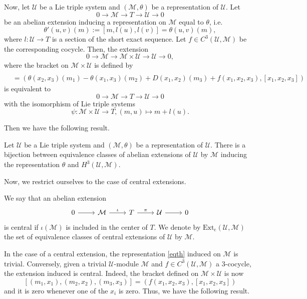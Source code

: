 \documentclass[11pt, twoside]{article}
\begin{document}
Now, let $\mathcal{U}$ be a Lie triple system and $(\mathcal{M},\theta)$ be a representation of $\mathcal{U}$. Let $$0\to \mathcal{M} \to T\to \mathcal{U}\to 0 $$ be an abelian extension inducing a representation on $\mathcal{M}$ equal to $\theta$, i.e. $$\theta'(u,v)(m):=[m,l(u),l(v)]=\theta(u,v)(m) ,$$ where $l:\mathcal{U}\to T$ is a section of the short exact sequence. Let $f\in C^3(\mathcal{U},\mathcal{M}) $ be the corresponding cocycle. Then, the extension $$0\to \mathcal{M}\to \mathcal{M}\times \mathcal{U}\to \mathcal{U}\to 0 ,$$ where the bracket on $\mathcal{M}\times \mathcal{U} $ is defined by  \begin{align*}
    [(m_1,x_1)&,(m_2,x_2),(m_3,x_3)] \\ &= (\theta(x_2,x_3)(m_1)- \theta(x_1,x_3)(m_2)+D(x_1,x_2)(m_3)+f(x_1,x_2,x_3),[x_1,x_2,x_3])
\end{align*} is equivalent to $$0\to \mathcal{M} \to T\to \mathcal{U}\to 0 $$ with the isomorphism of Lie triple systems $$\psi:\mathcal{M}\times \mathcal{U}\to T, (m,u)\mapsto m+l(u). $$

Then we have the following result.

\begin{thm}
    Let $\mathcal{U} $ be a Lie triple system and $(\mathcal{M},\theta) $ be a representation of $\mathcal{U}$. There is a bijection between equivalence classes of abelian extensions of $\mathcal{U}$ by $\mathcal{M}$ inducing the representation $\theta$ and $H^3(\mathcal{U},\mathcal{M}) $.
\end{thm}

Now, we restrict ourselves to the case of central extensions. 

\begin{defi}
    We say that an abelian extension \[\begin{tikzcd}
	0 & \mathcal{M} & T & {\mathcal{U}} & 0
	\arrow[from=1-1, to=1-2]
	\arrow["\iota", from=1-2, to=1-3]
	\arrow["\pi", from=1-3, to=1-4]
	\arrow[from=1-4, to=1-5]
\end{tikzcd}\] is central if $\iota(\mathcal{M}) $ is included in the center of $T$. We denote by $\mathrm{Ext_c}(\mathcal{U},\mathcal{M}) $ the set of equivalence classes of central extensions of $\mathcal{U}$ by $\mathcal{M}$. 
\end{defi}

In the case of a central extension, the representation \eqref{eqth} induced on $\mathcal{M}$ is trivial. Conversely, given a trivial $\mathcal{U}$-module $\mathcal{M}$ and $f\in C^3(\mathcal{U},\mathcal{M})$ a $3$-cocycle, the extension induced is central. Indeed, the bracket defined on $\mathcal{M}\times \mathcal{U}$ is now $$ [(m_1,x_1),(m_2,x_2),(m_3,x_3)]=(f(x_1,x_2,x_3),[x_1,x_2,x_3]) $$ and it is zero whenever one of the $x_i$ is zero. Thus, we have the following result.
\end{document}
